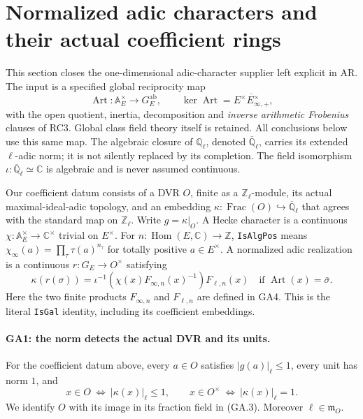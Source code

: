 \section{Normalized adic characters and their actual coefficient rings}
\label{sec:adic-realization}

This section closes the one-dimensional adic-character supplier left
explicit in AR. The input is a specified global reciprocity map
\[
 \operatorname{Art}:\mathbb A_E^\times\longrightarrow G_E^{\mathrm{ab}},
 \qquad
 \ker\operatorname{Art}
   =\overline{E^\times E_{\infty,+}^\times},                 \tag{GA.1}
\]
with the open quotient, inertia, decomposition and
\emph{inverse arithmetic Frobenius} clauses of RC3. Global class field
theory itself is retained. All conclusions below use this same map.
The algebraic closure of $\mathbb Q_\ell$, denoted
$\overline{\mathbb Q}_\ell$, carries its extended $\ell$-adic norm;
it is not silently replaced by its completion. The field isomorphism
$\iota:\overline{\mathbb Q}_\ell\simeq\mathbb C$ is algebraic and is
never assumed continuous.

Our coefficient datum consists of a DVR $O$, finite as a
$\mathbb Z_\ell$-module, its actual maximal-ideal-adic topology, and
an embedding
$\kappa:\operatorname{Frac}(O)\hookrightarrow\overline{\mathbb Q}_\ell$
that agrees with the standard map on $\mathbb Z_\ell$.
Write $g=\kappa|_O$. A Hecke character is a continuous
$\chi:\mathbb A_E^\times\to\mathbb C^\times$ trivial on $E^\times$.
For $n:\operatorname{Hom}(E,\mathbb C)\to\mathbb Z$,
\texttt{IsAlgPos} means
$\chi_\infty(a)=\prod_\tau\tau(a)^{n_\tau}$ for totally positive
$a\in E^\times$. A normalized adic realization is a continuous
$r:G_E\to O^\times$ satisfying
\[
 \kappa(r(\sigma))
 =\iota^{-1}\!\left(\chi(x)F_{\infty,n}(x)^{-1}\right)
       F_{\ell,n}(x)
 \quad\text{if }\operatorname{Art}(x)=\bar\sigma.            \tag{GA.2}
\]
Here the two finite products $F_{\infty,n}$ and $F_{\ell,n}$ are
defined in GA4. This is the literal \texttt{IsGal} identity,
including its coefficient embeddings.

\paragraph{GA1: the norm detects the actual DVR and its units.}
For the coefficient datum above, every $a\in O$ satisfies
$|g(a)|_\ell\leq1$, every unit has norm $1$, and
\[
 x\in O\ \Longleftrightarrow\ |\kappa(x)|_\ell\leq1,
 \qquad
 x\in O^\times\ \Longleftrightarrow\ |\kappa(x)|_\ell=1.      \tag{GA.3}
\]
We identify $O$ with its image in its fraction field in (GA.3).
Moreover $\ell\in\mathfrak m_O$.

